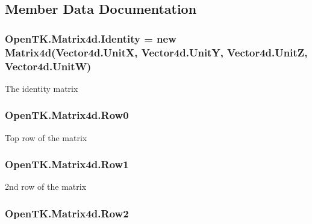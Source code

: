 \subsection{Member Data Documentation}
\hypertarget{struct_open_t_k_1_1_matrix4d_af14a29e7a625e5ce6753f3b144fdfc3d}{
\subsubsection[{Identity}]{ Open\-T\-K.\-Matrix4d.\-Identity = new {\bf Matrix4d}({\bf Vector4d.\-Unit\-X}, {\bf Vector4d.\-Unit\-Y}, {\bf Vector4d.\-Unit\-Z}, {\bf Vector4d.\-Unit\-W})\hspace{0.3cm}{\ttfamily [static]}}}\label{struct_open_t_k_1_1_matrix4d_af14a29e7a625e5ce6753f3b144fdfc3d}


The identity matrix 

\hypertarget{struct_open_t_k_1_1_matrix4d_adb270927a2e4ecfe812e95c2adc6a441}{
\subsubsection[{Row0}]{ Open\-T\-K.\-Matrix4d.\-Row0}}\label{struct_open_t_k_1_1_matrix4d_adb270927a2e4ecfe812e95c2adc6a441}


Top row of the matrix 

\hypertarget{struct_open_t_k_1_1_matrix4d_a25aaaff5953b88c33220af8cdf8f7530}{
\subsubsection[{Row1}]{ Open\-T\-K.\-Matrix4d.\-Row1}}\label{struct_open_t_k_1_1_matrix4d_a25aaaff5953b88c33220af8cdf8f7530}


2nd row of the matrix 

\hypertarget{struct_open_t_k_1_1_matrix4d_ac0eab4c78c7af0f1532aaefb40078ef5}{
\subsubsection[{Row2}]{ Open\-T\-K.\-Matrix4d.\-Row2}}\label{struct_open_t_k_1_1_matrix4d_ac0eab4c78c7af0f1532aaefb40078ef5}


